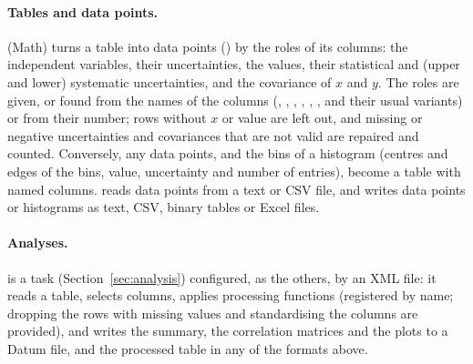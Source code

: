 \paragraph{Tables and data points.}
 (Math) turns a table into data points () by the roles of its columns:
the independent variables, their uncertainties, the values, their statistical and (upper and lower) systematic
uncertainties, and the covariance of $x$ and $y$. The roles are given, or found from the names of the columns
(, , , , , ,  and their usual
variants) or from their number; rows without $x$ or value are left out, and missing or negative uncertainties and
covariances that are not valid are repaired and counted. Conversely, any data points, and the bins of a histogram
(centres and edges of the bins, value, uncertainty and number of entries), become a table with named columns.
 reads data points from a text or CSV file, and writes data points or histograms as text, CSV,
binary tables or Excel files.

\paragraph{Analyses.}
 is a task (Section~\ref{sec:analysis}) configured, as the others, by an XML file: it
reads a table, selects columns, applies processing functions (registered by name; dropping the rows with missing
values and standardising the columns are provided), and writes the summary, the correlation matrices and the plots
to a Datum file, and the processed table in any of the formats above.

